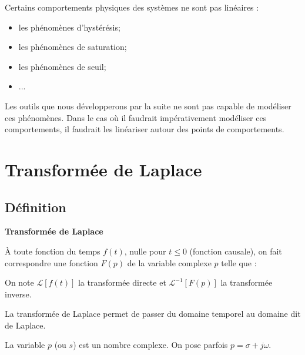 \documentclass[11pt,oneside]{article}
\begin{document}
Certains comportements physiques des systèmes ne sont pas linéaires :
\begin{itemize}
\item les phénomènes d'hystérésis;
\item les phénomènes de saturation;
\item les phénomènes de seuil;
\item ...
\end{itemize}

Les outils que nous développerons par la suite ne sont pas capable de modéliser ces phénomènes. Dans le cas où il faudrait impérativement modéliser ces comportements, il faudrait les linéariser autour des points de comportements.



\section{Transformée de Laplace}
\subsection{Définition}
\begin{defi}
\textbf{Transformée de Laplace}

À toute fonction du temps $f(t)$, nulle pour $t\leq0$ (fonction causale), on fait correspondre une fonction $F(p)$ de la variable complexe $p$ telle que :


On note $\mathcal{L}\left[f(t)\right]$ la transformée directe et $\mathcal{L}^{-1}\left[F(p)\right]$ la transformée inverse.
\end{defi}

La transformée de Laplace permet de passer du domaine temporel au domaine dit de Laplace.

La variable $p$ (ou $s$) est un nombre complexe. On pose parfois $p=\sigma + j\omega$.
\end{document}
